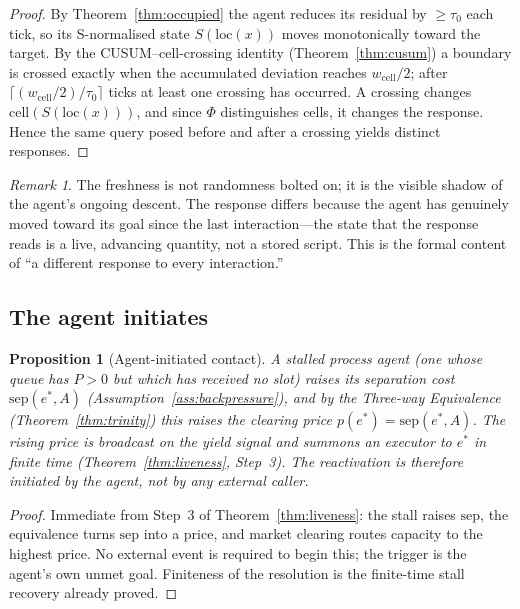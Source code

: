 \documentclass[11pt,twocolumn,a4paper]{article}
\theoremstyle{plain}
\newtheorem{proposition}[theorem]{Proposition}
\theoremstyle{definition}
\theoremstyle{remark}
\newtheorem{remark}[theorem]{Remark}
\newcommand{\tick}{\tau_0}
\newcommand{\sep}{\mathrm{sep}}
\newcommand{\cell}{\mathrm{cell}}
\newcommand{\Scal}{S}
\newcommand{\pres}{P}
\begin{document}
\begin{proof}
By Theorem~\ref{thm:occupied} the agent reduces its residual by $\geq \tick$ each
tick, so its S-normalised state $\Scal(\mathrm{loc}(x))$ moves monotonically toward
the target. By the CUSUM--cell-crossing identity (Theorem~\ref{thm:cusum}) a
boundary is crossed exactly when the accumulated deviation reaches $w_{\cell}/2$;
after $\lceil (w_{\cell}/2)/\tick \rceil$ ticks at least one crossing has occurred.
A crossing changes $\cell(\Scal(\mathrm{loc}(x)))$, and since $\Phi$ distinguishes
cells, it changes the response. Hence the same query posed before and after a
crossing yields distinct responses.
\end{proof}

\begin{remark}
The freshness is not randomness bolted on; it is the visible shadow of the agent's
ongoing descent. The response differs because the agent has genuinely moved toward
its goal since the last interaction---the state that the response reads is a live,
advancing quantity, not a stored script. This is the formal content of ``a
different response to every interaction.''
\end{remark}

\subsection{The agent initiates}

\begin{proposition}[Agent-initiated contact]
\label{prop:hail}
A stalled process agent (one whose queue has $\pres > 0$ but which has received no
slot) raises its separation cost $\sep(e^*, A)$
(Assumption~\ref{ass:backpressure}), and by the Three-way Equivalence
(Theorem~\ref{thm:trinity}) this raises the clearing price $p(e^*) = \sep(e^*, A)$.
The rising price is broadcast on the yield signal and \emph{summons} an executor to
$e^*$ in finite time (Theorem~\ref{thm:liveness}, Step~3). The reactivation is
therefore \emph{initiated by the agent}, not by any external caller.
\end{proposition}

\begin{proof}
Immediate from Step~3 of Theorem~\ref{thm:liveness}: the stall raises $\sep$, the
equivalence turns $\sep$ into a price, and market clearing routes capacity to the
highest price. No external event is required to begin this; the trigger is the
agent's own unmet goal. Finiteness of the resolution is the finite-time stall
recovery already proved.
\end{proof}
\end{document}
